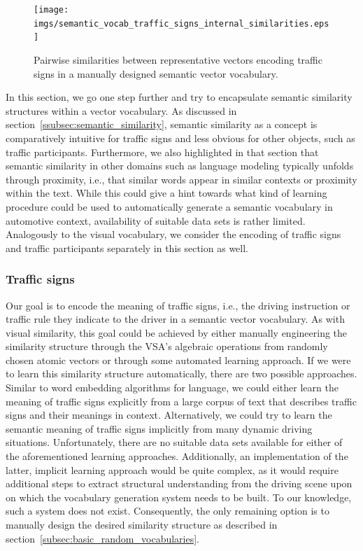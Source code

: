\begin{figure}[t]
    \centering
    \texttt{[image: imgs/semantic\_vocab\_traffic\_signs\_internal\_similarities.eps]}
    \caption{Pairwise similarities between representative vectors encoding traffic signs in a manually designed semantic vector vocabulary.}
    \label{fig:semantic_vocab_traffic_signs_internal_similarities}
\end{figure}
In this section, we go one step further and try to encapsulate semantic similarity structures within a vector vocabulary.
As discussed in section~\ref{ssubsec:semantic_similarity}, semantic similarity as a concept is comparatively intuitive for traffic signs and less obvious for other objects, such as traffic participants.
Furthermore, we also highlighted in that section that semantic similarity in other domains such as language modeling typically unfolds through proximity, i.e., that similar words appear in similar contexts or proximity within the text.
While this could give a hint towards what kind of learning procedure could be used to automatically generate a semantic vocabulary in automotive context, availability of suitable data sets is rather limited.
Analogously to the visual vocabulary, we consider the encoding of traffic signs and traffic participants separately in this section as well. 

\subsubsection{Traffic signs}%
\label{ssubsec:traffic_signs}

Our goal is to encode the meaning of traffic signs, i.e., the driving instruction or traffic rule they indicate to the driver in a semantic vector vocabulary.
As with visual similarity, this goal could be achieved by either manually engineering the similarity structure through the \ac{VSA}'s algebraic operations from randomly chosen atomic vectors or through some automated learning approach.
If we were to learn this similarity structure automatically, there are two possible approaches. 
Similar to word embedding algorithms for language, we could either learn the meaning of traffic signs explicitly from a large  corpus of text that describes traffic signs and their meanings in context.
Alternatively, we could try to learn the semantic meaning of traffic signs implicitly from many dynamic driving situations.
Unfortunately, there are no suitable data sets available for either of the aforementioned learning approaches.
Additionally, an implementation of the latter, implicit learning approach would be quite complex, as it would require additional steps to extract structural understanding from the driving scene upon on which the vocabulary generation system needs to be built.
To our knowledge, such a system does not exist.
Consequently, the only remaining option is to manually design the desired similarity structure as described in section~\ref{subsec:basic_random_vocabularies}.

